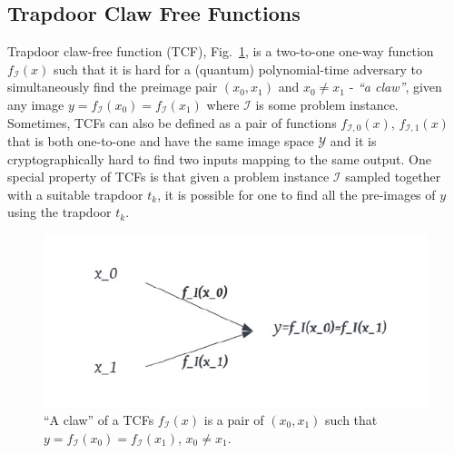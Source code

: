 \documentclass[cryptography,review,submit,pdftex,moreauthors,amsmath,amssymb,aps,strict]{Definitions/mdpi}
\begin{document}
\subsection{Trapdoor Claw Free Functions}\label{TCFs}


Trapdoor claw-free function (TCF), Fig.~\ref{fig:TCF}, is a two-to-one one-way function $f_\mathcal{I}(x)$ such that it is hard for a (quantum) polynomial-time adversary to simultaneously find the preimage pair $(x_0,x_1)$ and $x_0\neq x_1$ - \textit{``a claw''}, given any image $y = f_{\mathcal{I}}(x_0)=f_{\mathcal{I}}(x_1)$  where $\mathcal{I}$ is some problem instance. Sometimes, TCFs can also be defined as a pair of functions $f_{\mathcal{I},0}(x)$, $f_{\mathcal{I},1}(x)$ that is both one-to-one and have the same image space $\mathcal{Y}$ and it is cryptographically hard to find two inputs mapping to the same output. One special property of TCFs is that given a problem instance $\mathcal{I}$ sampled together with a suitable trapdoor $t_{k}$, it is possible for one to find all the pre-images of $y$ using the trapdoor $t_{k}$. 

\begin{figure}[!htb]
	\centering
	\includegraphics[]{figures/TCF.pdf}
	\caption{``A claw'' of a TCFs $f_{\mathcal{I}}(x)$ is a pair of $(x_0,x_1)$ such that $y=f_{\mathcal{I}}(x_0)=f_{\mathcal{I}}(x_1)$, $x_0\neq x_1$.}\label{fig:TCF}
\end{figure}
\end{document}
